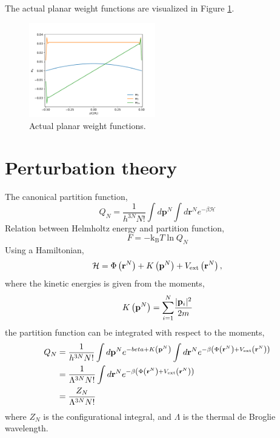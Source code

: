 \documentclass[12pt, letterpaper]{article}
\newcommand*{\abs}[1]{\lvert#1\rvert}
\newcommand*{\lb}{\ensuremath{\left(}}
\newcommand*{\rb}{\ensuremath{\right)}}
\newcommand{\rvec}{\ensuremath{\mathbf{r}}\xspace}
\newcommand{\pvec}{\ensuremath{\mathbf{p}}\xspace}
\newcommand{\kB}{\ensuremath{\text{k}_{\text{B}}}\xspace}
\newcommand{\external}{\ensuremath{\text{ext}}\xspace}
\begin{document}
The actual planar weight functions are visualized in Figure
\ref{fig:actual_planar_weights}.
\begin{figure}[tbp]
  \centering
  \includegraphics[width=0.49\textwidth]{gfx/actual_planar_weights}
  \caption{Actual planar weight functions.}
  \label{fig:actual_planar_weights}
\end{figure}

\section{Perturbation theory}
The canonical partition function,
\begin{equation}
  Q_N = \frac{1}{h^{3N}N!}\int d \mathbf{p}^N \int d \rvec^N e^{-\beta \mathcal{H}}
\end{equation}
Relation between Helmholtz energy and partition function,
\begin{equation}
  \label{eq:helm_statmec}
  F = -\kB T \ln Q_N
\end{equation}
Using a Hamiltonian,
\begin{equation}
  \mathcal{H} = \Phi \lb \rvec^N \rb + K\lb \pvec^N \rb + V_\external \lb \rvec^N \rb,
\end{equation}
where the kinetic energies is given from the moments,
\begin{equation}
  K\lb \pvec^N \rb = \overset{N}{\underset{i=1}{\sum}} \frac{\abs{\pvec_i}^2}{2 m}
\end{equation}
the partition function can be integrated with respect to the moments,
\begin{align}
  Q_N &= \frac{1}{h^{3N}N!}\int d \mathbf{p}^N e^{-beta + K\lb \pvec^N \rb } \int d \rvec^N e^{-\beta \lb \Phi \lb \rvec^N \rb + V_\external \lb \rvec^N \rb \rb} \nonumber \\
      &= \frac{1}{\Lambda^{3N}N!} \int d \rvec^N e^{-\beta \lb \Phi \lb \rvec^N \rb + V_\external \lb \rvec^N \rb \rb} \nonumber\\
  &= \frac{Z_N}{\Lambda^{3N}N!}
\end{align}
where $Z_N$ is the configurational integral, and $\Lambda$ is the
thermal de Broglie wavelength.
\end{document}
